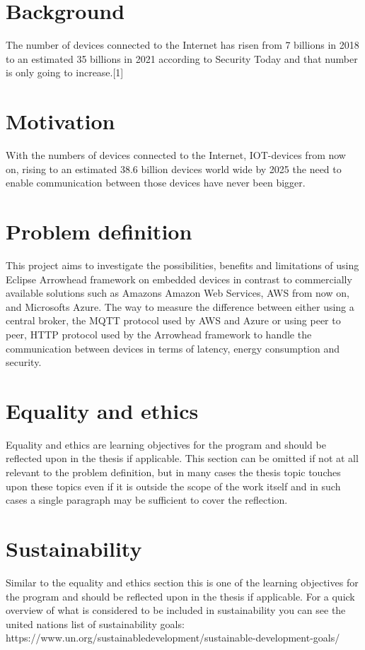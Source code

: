 \section{Background}
The number of devices connected to the Internet has risen from 7 billions in 2018 to an estimated 35 billions in 2021 according to Security Today and that number is only going to increase.[1] %
\section{Motivation}
With the numbers of devices connected to the Internet, IOT-devices from now on, rising to an estimated 38.6 billion devices world wide by 2025 the need to enable communication between those devices have never been bigger.
\section{Problem definition}
This project aims to investigate the possibilities, benefits and limitations of using Eclipse Arrowhead framework on embedded devices in contrast to commercially available solutions such
as Amazons Amazon Web Services, AWS 
from now on, and Microsofts Azure.  
The way to measure the difference between either 
using a central broker, the MQTT protocol used by AWS and Azure or using peer to peer, 
HTTP protocol used by the Arrowhead framework to handle the communication between devices in terms of latency, 
energy consumption and
security.

\section{Equality and ethics}
Equality and ethics are learning objectives for the program and should be reflected upon in the thesis if applicable. This section can be omitted if not at all relevant to the problem definition, but in many cases the thesis topic touches upon these topics even if it is outside the scope of the work itself and in such cases a single paragraph may be sufficient to cover the reflection.
\section{Sustainability}
Similar to the equality and ethics section this is one of the learning objectives for the program and should be reflected upon in the thesis if applicable. For a quick overview of what is considered to be included in sustainability you can see the united nations list of sustainability goals: https://www.un.org/sustainabledevelopment/sustainable-development-goals/
